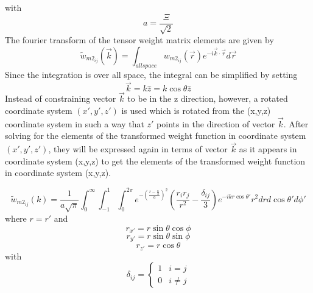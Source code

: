 \documentclass[letterpaper,twocolumn,amsmath,amssymb,prb]{revtex4-1}
\begin{document}
\begin{widetext}
with 
\begin{equation}{a=\frac{\Xi}{\sqrt{2}}}\end{equation}
The fourier transform of the tensor weight matrix elements are given by
\begin{equation}{\widetilde{w}_{m2_{ij}}(\vec{k})=\int_{allspace}{w_{{m2}_{ij}}}(\vec{r})e^{-i\vec{k}\cdot\vec{r}}d{\vec{r}}}\end{equation}
Since the integration is over all space, the integral can be simplified by setting 
\begin{equation}{\vec{k}=k\hat{z}=k\cos\theta\hat{z}}\end{equation}
Instead of constraining vector $\vec{k}$ to be in the z direction, however, a rotated coordinate system $(x',y',z')$ is used which is rotated from the (x,y,z) coordinate system in such a way that $z'$ points in the direction of vector $\vec{k}$. After solving for the elements of the transformed weight function in coordinate system $(x',y',z')$, they will be expressed again in terms of vector $\vec{k}$ as it appears in coordinate system (x,y,z) to get the elements of the transformed weight function in coordinate system (x,y,z).

\begin{equation}{\widetilde{w}_{m2_{ij}}(k)=\frac{1}{a\sqrt{\pi}}\int_{0}^{\infty}\int_{-1}^{1}\int_{0}^{2\pi}e^{-\left(\frac{r-\frac{\alpha}{2}}{a}\right)^2}\left(\frac{r_ir_j}{r^2}-\frac{\delta_{ij}}{3}\right)e^{-ikr\cos\theta'}r^2d{r}d{\cos\theta'}d{\phi'}}\end{equation}
where $r=r'$ and
\begin{displaymath}{r_{x'}=r\sin\theta\cos\phi}\end{displaymath}
\begin{displaymath}{r_{y'}=r\sin\theta\sin\phi}\end{displaymath}
\begin{displaymath}{r_{z'}=r\cos\theta}\end{displaymath} 
with
\begin{displaymath}{\delta_{ij}=\left\{ \begin{array}{rc} 1 & i = j \\ 0  & i\neq j \end{array}\right.}\end{displaymath}
\[{}\]


\end{widetext}
\end{document}
